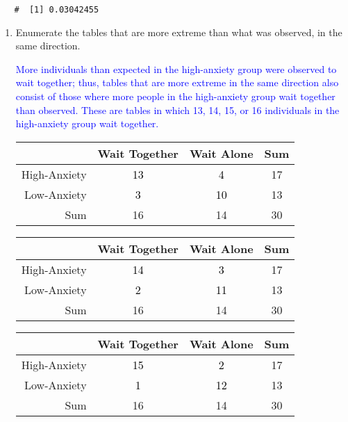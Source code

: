 \documentclass[letterpaper,12pt,twoside,]{pinp}
\begin{document}
\begin{enumerate}
  \begin{ShadedResult}
   \begin{verbatim}
   #  [1] 0.03042455
   \end{verbatim}
   \end{ShadedResult}

  \begin{enumerate}
  \def\labelenumii{\alph{enumii})}
  \setcounter{enumii}{2}
  \item
    Enumerate the tables that are more extreme than what was observed,
    in the same direction.

    \textcolor{blue}{More individuals than expected in the high-anxiety group were observed to wait together; thus, tables that are more extreme in the same direction also consist of those where more people in the high-anxiety group wait together than observed. These are tables in which 13, 14, 15, or 16 individuals in the high-anxiety group wait together.}

    \begin{table}[h]
     \centering
     \color{gray}
     \begin{tabular}{r|cc|c}
     \hline
     & Wait Together & Wait Alone & Sum \\ 
     \hline
     High-Anxiety & \textcolor{black}{13} & \textcolor{black}{4} & 17 \\ 
     Low-Anxiety & \textcolor{black}{3} & \textcolor{black}{10} & 13 \\ 
     \hline
     Sum & 16 & 14 & 30 \\ 
     \hline
     \end{tabular}
     \end{table}

    \begin{table}[h!]
     \centering
     \color{gray}
     \begin{tabular}{r|cc|c}
     \hline
     & Wait Together & Wait Alone & Sum \\ 
     \hline
     High-Anxiety & \textcolor{black}{14} & \textcolor{black}{3} & 17 \\ 
     Low-Anxiety & \textcolor{black}{2} & \textcolor{black}{11} & 13 \\ 
     \hline
     Sum & 16 & 14 & 30 \\ 
     \hline
     \end{tabular}
     \end{table}

    \begin{table}[h!]
     \centering
     \color{gray}
     \begin{tabular}{r|cc|c}
     \hline
     & Wait Together & Wait Alone & Sum \\ 
     \hline
     High-Anxiety & \textcolor{black}{15} & \textcolor{black}{2} & 17 \\ 
     Low-Anxiety & \textcolor{black}{1} & \textcolor{black}{12} & 13 \\ 
     \hline
     Sum & 16 & 14 & 30 \\ 
     \hline
     \end{tabular}
     \end{table}


\end{enumerate}
\end{enumerate}
\end{document}
